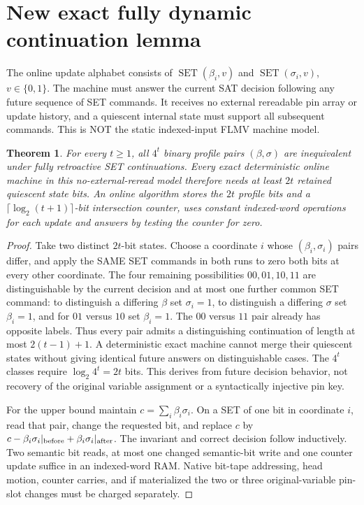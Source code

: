 \documentclass[11pt]{article}
\newtheorem{theorem}{Theorem}
\begin{document}
\section{New exact fully dynamic continuation lemma}
The online update alphabet consists of $\operatorname{SET}(\beta_i,v)$ and $\operatorname{SET}(\sigma_i,v)$, $v\in\{0,1\}$. The machine must answer the current SAT decision following any future sequence of SET commands. It receives no external rereadable pin array or update history, and a quiescent internal state must support all subsequent commands. This is NOT the static indexed-input FLMV machine model.
\begin{theorem}
For every $t\ge1$, all $4^t$ binary profile pairs $(\beta,\sigma)$ are inequivalent under fully retroactive SET continuations. Every exact deterministic online machine in this no-external-reread model therefore needs at least $2t$ retained quiescent state bits. An online algorithm stores the $2t$ profile bits and a $\lceil\log_2(t+1)\rceil$-bit intersection counter, uses constant indexed-word operations for each update and answers by testing the counter for zero.
\end{theorem}
\begin{proof}
Take two distinct $2t$-bit states. Choose a coordinate $i$ whose $(\beta_i,\sigma_i)$ pairs differ, and apply the SAME SET commands in both runs to zero both bits at every other coordinate. The four remaining possibilities $00,01,10,11$ are distinguishable by the current decision and at most one further common SET command: to distinguish a differing $\beta$ set $\sigma_i=1$, to distinguish a differing $\sigma$ set $\beta_i=1$, and for $01$ versus $10$ set $\beta_i=1$. The $00$ versus $11$ pair already has opposite labels. Thus every pair admits a distinguishing continuation of length at most $2(t-1)+1$. A deterministic exact machine cannot merge their quiescent states without giving identical future answers on distinguishable cases. The $4^t$ classes require $\log_2 4^t=2t$ bits. This derives from future decision behavior, not recovery of the original variable assignment or a syntactically injective pin key.

For the upper bound maintain $c=\sum_i\beta_i\sigma_i$. On a SET of one bit in coordinate $i$, read that pair, change the requested bit, and replace $c$ by $c-\beta_i\sigma_i|_{\rm before}+\beta_i\sigma_i|_{\rm after}$. The invariant and correct decision follow inductively. Two semantic bit reads, at most one changed semantic-bit write and one counter update suffice in an indexed-word RAM. Native bit-tape addressing, head motion, counter carries, and if materialized the two or three original-variable pin-slot changes must be charged separately.
\end{proof}
\end{document}
